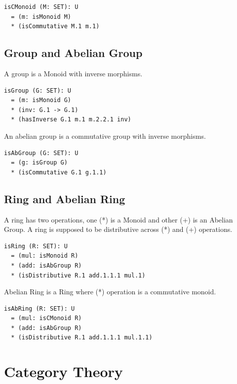 \documentclass{article}
\begin{document}
\begin{lstlisting}[mathescape=true]
isCMonoid (M: SET): U
  = (m: isMonoid M)
  * (isCommutative M.1 m.1)
\end{lstlisting}

\subsection{Group and Abelian Group}

A group is a Monoid with inverse morphisms.

\begin{lstlisting}[mathescape=true]
isGroup (G: SET): U
  = (m: isMonoid G)
  * (inv: G.1 -> G.1)
  * (hasInverse G.1 m.1 m.2.2.1 inv)
\end{lstlisting}

An abelian group is a commutative group with inverse morphisms.

\begin{lstlisting}[mathescape=true]
isAbGroup (G: SET): U
  = (g: isGroup G)
  * (isCommutative G.1 g.1.1)
\end{lstlisting}

\subsection{Ring and Abelian Ring}

A ring has two operations, one (*) is a Monoid and other (+) is an Abelian Group.
A ring is supposed to be distributive across (*) and (+) operations.

\begin{lstlisting}[mathescape=true]
isRing (R: SET): U
  = (mul: isMonoid R)
  * (add: isAbGroup R)
  * (isDistributive R.1 add.1.1.1 mul.1)
\end{lstlisting}

Abelian Ring is a Ring where (*) operation is a commutative monoid.

\begin{lstlisting}[mathescape=true]
isAbRing (R: SET): U
  = (mul: isCMonoid R)
  * (add: isAbGroup R)
  * (isDistributive R.1 add.1.1.1 mul.1.1)
\end{lstlisting}

\section{Category Theory}
\end{document}
